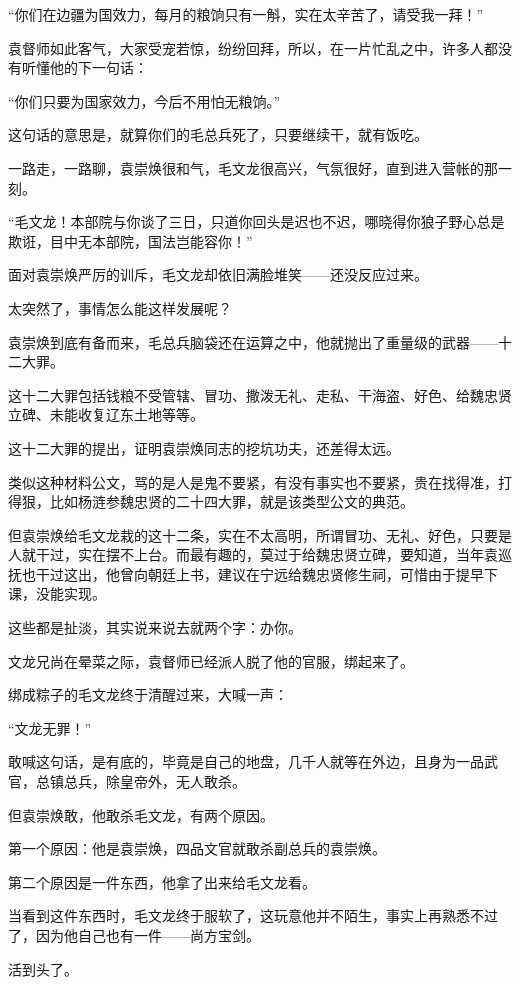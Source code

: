\begin{multicols}{\theparacolNo}
		“你们在边疆为国效力，每月的粮饷只有一斛，实在太辛苦了，请受我一拜！”

		袁督师如此客气，大家受宠若惊，纷纷回拜，所以，在一片忙乱之中，许多人都没有听懂他的下一句话：

		“你们只要为国家效力，今后不用怕无粮饷。”

		这句话的意思是，就算你们的毛总兵死了，只要继续干，就有饭吃。

		一路走，一路聊，袁崇焕很和气，毛文龙很高兴，气氛很好，直到进入营帐的那一刻。

		“毛文龙！本部院与你谈了三日，只道你回头是迟也不迟，哪晓得你狼子野心总是欺诳，目中无本部院，国法岂能容你！”

		面对袁崇焕严厉的训斥，毛文龙却依旧满脸堆笑——还没反应过来。

		太突然了，事情怎么能这样发展呢？

		袁崇焕到底有备而来，毛总兵脑袋还在运算之中，他就抛出了重量级的武器——十二大罪。

		这十二大罪包括钱粮不受管辖、冒功、撒泼无礼、走私、干海盗、好色、给魏忠贤立碑、未能收复辽东土地等等。

		这十二大罪的提出，证明袁崇焕同志的挖坑功夫，还差得太远。

		类似这种材料公文，骂的是人是鬼不要紧，有没有事实也不要紧，贵在找得准，打得狠，比如杨涟参魏忠贤的二十四大罪，就是该类型公文的典范。

		但袁崇焕给毛文龙栽的这十二条，实在不太高明，所谓冒功、无礼、好色，只要是人就干过，实在摆不上台。而最有趣的，莫过于给魏忠贤立碑，要知道，当年袁巡抚也干过这出，他曾向朝廷上书，建议在宁远给魏忠贤修生祠，可惜由于提早下课，没能实现。

		这些都是扯淡，其实说来说去就两个字：办你。

		文龙兄尚在晕菜之际，袁督师已经派人脱了他的官服，绑起来了。

		绑成粽子的毛文龙终于清醒过来，大喊一声：

		“文龙无罪！”

		敢喊这句话，是有底的，毕竟是自己的地盘，几千人就等在外边，且身为一品武官，总镇总兵，除皇帝外，无人敢杀。

		但袁崇焕敢，他敢杀毛文龙，有两个原因。

		第一个原因：他是袁崇焕，四品文官就敢杀副总兵的袁崇焕。

		第二个原因是一件东西，他拿了出来给毛文龙看。

		当看到这件东西时，毛文龙终于服软了，这玩意他并不陌生，事实上再熟悉不过了，因为他自己也有一件——尚方宝剑。

		活到头了。


\end{multicols}
